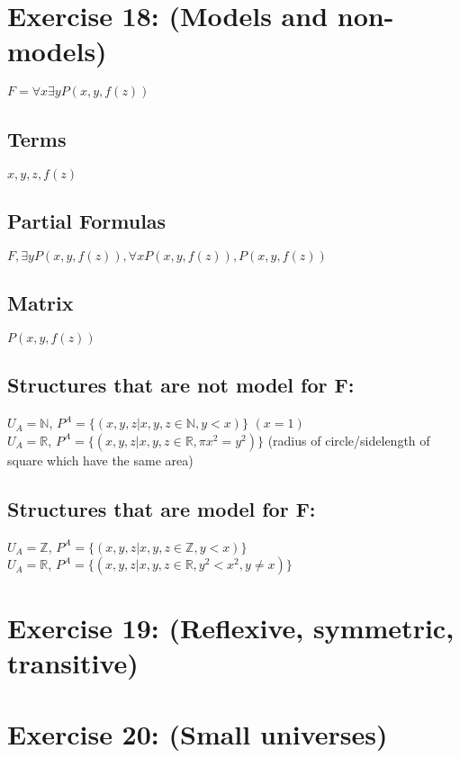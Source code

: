 \documentclass[12pt]{article}
\newcommand{\R}{\mathbb R}
\newcommand{\N}{\mathbb N}
\newcommand{\Z}{\mathbb Z}
\begin{document}
\section*{Exercise 18: (Models and non-models)}
$F=\forall x \exists y P(x,y,f(z))$\\
\subsection*{Terms}
$x,y,z,f(z)$\\
\subsection*{Partial Formulas}
$F,\exists y P(x,y,f(z)), \forall x P(x,y,f(z)), P(x,y,f(z)) $

\subsection*{Matrix}
$P(x,y,f(z))$

\subsection*{Structures that are not model for F:}

$U_A = \N$, $P^A=\{(x,y,z | x,y,z \in \N, y<x)\}$ $(x=1)$\\
$U_A = \R$, $P^A=\{(x,y,z | x,y,z \in \R, \pi x^2 = y^2)\}$ (radius of circle/sidelength of square which have the same area)

\subsection*{Structures that are model for F:}

$U_A = \Z$, $P^A=\{(x,y,z | x,y,z \in \Z, y<x)\}$\\
$U_A = \R$, $P^A=\{(x,y,z | x,y,z \in \R, y^2<x^2, y \neq x)\}$\\

\section*{Exercise 19: (Reflexive, symmetric, transitive)}

\section*{Exercise 20: (Small universes)}

\end{document}
